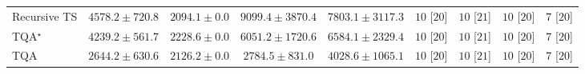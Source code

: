 \begin{tabular}{l|cccc|cccc|}
Recursive TS & {\cellcolor[HTML]{A5BDDB}} \color[HTML]{000000} $4578.2\pm 720.8$ & {\cellcolor[HTML]{F8F1F8}} \color[HTML]{000000} $2094.1\pm 0.0$ & {\cellcolor[HTML]{023E62}} \color[HTML]{F1F1F1} $9099.4\pm 3870.4$ & {\cellcolor[HTML]{0567A1}} \color[HTML]{F1F1F1} $7803.1\pm 3117.3$ & {\cellcolor[HTML]{49006A}} \color[HTML]{F1F1F1} $10$ [$20$] & {\cellcolor[HTML]{49006A}} \color[HTML]{F1F1F1} $10$ [$21$] & {\cellcolor[HTML]{49006A}} \color[HTML]{F1F1F1} $10$ [$20$] & {\cellcolor[HTML]{FFF7F3}} \color[HTML]{000000} $7$ [$20$] \\
TQA$^\star$ & {\cellcolor[HTML]{B4C4DF}} \color[HTML]{000000} $4239.2\pm 561.7$ & {\cellcolor[HTML]{F5EEF6}} \color[HTML]{000000} $2228.6\pm 0.0$ & {\cellcolor[HTML]{509AC6}} \color[HTML]{F1F1F1} $6051.2\pm 1720.6$ & {\cellcolor[HTML]{2F8BBE}} \color[HTML]{F1F1F1} $6584.1\pm 2329.4$ & {\cellcolor[HTML]{49006A}} \color[HTML]{F1F1F1} $10$ [$20$] & {\cellcolor[HTML]{49006A}} \color[HTML]{F1F1F1} $10$ [$21$] & {\cellcolor[HTML]{49006A}} \color[HTML]{F1F1F1} $10$ [$20$] & {\cellcolor[HTML]{FFF7F3}} \color[HTML]{000000} $7$ [$20$] \\
TQA & {\cellcolor[HTML]{EDE7F2}} \color[HTML]{000000} $2644.2\pm 630.6$ & {\cellcolor[HTML]{F7F0F7}} \color[HTML]{000000} $2126.2\pm 0.0$ & {\cellcolor[HTML]{E8E4F0}} \color[HTML]{000000} $2784.5\pm 831.0$ & {\cellcolor[HTML]{BDC8E1}} \color[HTML]{000000} $4028.6\pm 1065.1$ & {\cellcolor[HTML]{49006A}} \color[HTML]{F1F1F1} $10$ [$20$] & {\cellcolor[HTML]{49006A}} \color[HTML]{F1F1F1} $10$ [$21$] & {\cellcolor[HTML]{49006A}} \color[HTML]{F1F1F1} $10$ [$20$] & {\cellcolor[HTML]{FFF7F3}} \color[HTML]{000000} $7$ [$20$] \\
\cline{1-9}
\bottomrule
\end{tabular}
